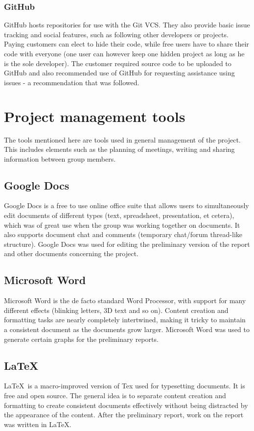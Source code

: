 \subsubsection{GitHub}
GitHub hosts repositories for use with the Git VCS. They also provide basic issue tracking and social features, such as following other developers or projects. Paying customers can elect to hide their code, while free users have to share their code with everyone (one user can however keep one hidden project as long as he is the sole developer). The customer required source code to be uploaded to GitHub and also recommended use of GitHub for requesting assistance using issues - a recommendation that was followed.

\section{Project management tools}
The tools mentioned here are tools used in general management of the project. This includes elements such as the planning of meetings, writing and sharing information between group members.

\subsection{Google Docs}
Google Docs is a free to use online office suite that allows users to simultaneously edit documents of different types (text, spreadsheet, presentation, et cetera), which was of great use when the group was working together on documents. It also supports document chat and comments (temporary chat/forum thread-like structure). Google Docs was used for editing the preliminary version of the report and other documents concerning the project.

\subsection{Microsoft Word}
Microsoft Word is the de facto standard Word Processor, with support for many different effects (blinking letters, 3D text and so on). Content creation and formatting tasks are nearly completely intertwined, making it tricky to maintain a consistent document as the documents grow larger. Microsoft Word was used to generate certain graphs for the preliminary reports.

\subsection{\LaTeX}
\LaTeX ~is a macro-improved version of Tex used for typesetting documents. It is free and open source. The general idea is to separate content creation and formatting to create consistent documents effectively without being distracted by the appearance of the content. After the preliminary report, work on the report was written in \LaTeX.

